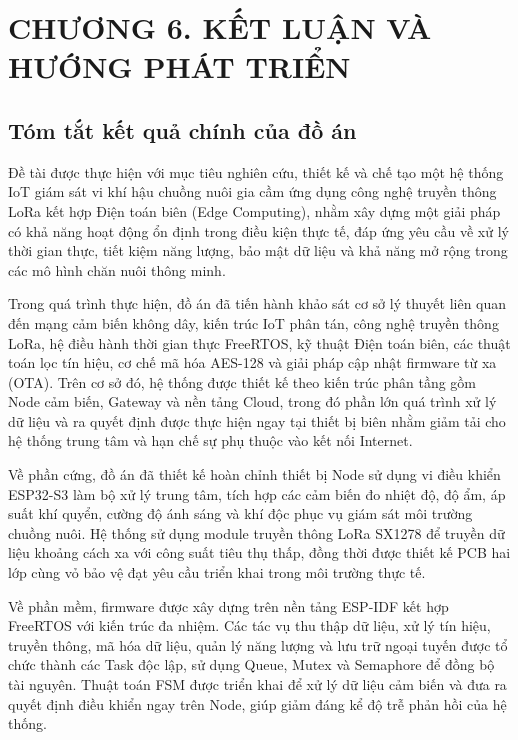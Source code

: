\section*{CHƯƠNG 6. KẾT LUẬN VÀ HƯỚNG PHÁT TRIỂN}
\setcounter{section}{6}
\setcounter{subsection}{0}
\setcounter{figure}{0}
\setcounter{table}{0}

\subsection{Tóm tắt kết quả chính của đồ án}

Đề tài được thực hiện với mục tiêu nghiên cứu, thiết kế và chế tạo một hệ thống IoT giám sát vi khí hậu chuồng nuôi gia cầm ứng dụng công nghệ truyền thông LoRa kết hợp Điện toán biên (Edge Computing), nhằm xây dựng một giải pháp có khả năng hoạt động ổn định trong điều kiện thực tế, đáp ứng yêu cầu về xử lý thời gian thực, tiết kiệm năng lượng, bảo mật dữ liệu và khả năng mở rộng trong các mô hình chăn nuôi thông minh.

Trong quá trình thực hiện, đồ án đã tiến hành khảo sát cơ sở lý thuyết liên quan đến mạng cảm biến không dây, kiến trúc IoT phân tán, công nghệ truyền thông LoRa, hệ điều hành thời gian thực FreeRTOS, kỹ thuật Điện toán biên, các thuật toán lọc tín hiệu, cơ chế mã hóa AES-128 và giải pháp cập nhật firmware từ xa (OTA). Trên cơ sở đó, hệ thống được thiết kế theo kiến trúc phân tầng gồm Node cảm biến, Gateway và nền tảng Cloud, trong đó phần lớn quá trình xử lý dữ liệu và ra quyết định được thực hiện ngay tại thiết bị biên nhằm giảm tải cho hệ thống trung tâm và hạn chế sự phụ thuộc vào kết nối Internet.

Về phần cứng, đồ án đã thiết kế hoàn chỉnh thiết bị Node sử dụng vi điều khiển ESP32-S3 làm bộ xử lý trung tâm, tích hợp các cảm biến đo nhiệt độ, độ ẩm, áp suất khí quyển, cường độ ánh sáng và khí độc phục vụ giám sát môi trường chuồng nuôi. Hệ thống sử dụng module truyền thông LoRa SX1278 để truyền dữ liệu khoảng cách xa với công suất tiêu thụ thấp, đồng thời được thiết kế PCB hai lớp cùng vỏ bảo vệ đạt yêu cầu triển khai trong môi trường thực tế.

Về phần mềm, firmware được xây dựng trên nền tảng ESP-IDF kết hợp FreeRTOS với kiến trúc đa nhiệm. Các tác vụ thu thập dữ liệu, xử lý tín hiệu, truyền thông, mã hóa dữ liệu, quản lý năng lượng và lưu trữ ngoại tuyến được tổ chức thành các Task độc lập, sử dụng Queue, Mutex và Semaphore để đồng bộ tài nguyên. Thuật toán FSM được triển khai để xử lý dữ liệu cảm biến và đưa ra quyết định điều khiển ngay trên Node, giúp giảm đáng kể độ trễ phản hồi của hệ thống.

